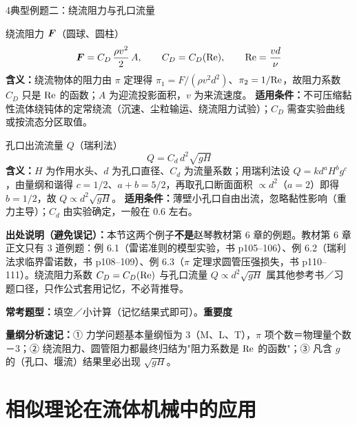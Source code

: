 \begin{kaodian}{4}{典型例题二：绕流阻力与孔口流量}
\begin{gongshi}{绕流阻力 $\bm{F}$（圆球、圆柱）}
\[ \bm{F}=C_D\,\frac{\rho v^{2}}{2}\,A,\qquad C_D=C_D(\mathrm{Re}),\qquad \mathrm{Re}=\frac{vd}{\nu} \]
\textbf{含义：}绕流物体的阻力由 $\pi$ 定理得 $\pi_1=F/(\rho v^{2}d^{2})$、$\pi_2=1/\mathrm{Re}$，故阻力系数 $C_D$ 只是 $\mathrm{Re}$ 的函数；$A$ 为迎流投影面积，$v$ 为来流速度。
\textbf{适用条件：}不可压缩黏性流体绕钝体的定常绕流（沉速、尘粒输运、绕流阻力试验）；$C_D$ 需查实验曲线或按流态分区取值。
\end{gongshi}

\begin{gongshi}{孔口出流流量 $Q$（瑞利法）}
\[ Q=C_d\,d^{2}\sqrt{gH} \]
\textbf{含义：}$H$ 为作用水头、$d$ 为孔口直径、$C_d$ 为流量系数；用瑞利法设 $Q=k d^{a}H^{b}g^{c}$，由量纲和谐得 $c=1/2$、$a+b=5/2$，再取孔口断面面积 $\propto d^{2}$（$a=2$）即得 $b=1/2$，故 $Q\propto d^{2}\sqrt{gH}$。
\textbf{适用条件：}薄壁小孔口自由出流，忽略黏性影响（重力主导）；$C_d$ 由实验确定，一般在 0.6 左右。
\end{gongshi}

\begin{tishi}
\textbf{出处说明（避免误记）：}本节这两个例子\textbf{不是}赵琴教材第 6 章的例题。教材第 6 章正文只有 3 道例题：例 6.1（雷诺准则的模型实验，书 p105--106）、例 6.2（瑞利法求临界雷诺数，书 p108--109）、例 6.3（$\pi$ 定理求圆管压强损失，书 p110--111）。绕流阻力系数 $C_D=C_D(\mathrm{Re})$ 与孔口流量 $Q\propto d^{2}\sqrt{gH}$ 属其他参考书／习题口径，只作公式套用记忆，不必背推导。
\end{tishi}

\textbf{常考题型：}填空／小计算（记忆结果式即可）。\quad\textbf{重要度 }\quad{}\quad{}
\end{kaodian}

\begin{tishi}
\textbf{量纲分析速记：}① 力学问题基本量纲恒为 3（M、L、T），$\pi$ 项个数＝物理量个数－3；② 绕流阻力、圆管阻力都最终归结为"阻力系数是 $\mathrm{Re}$ 的函数"；③ 凡含 $g$ 的（孔口、堰流）结果里必出现 $\sqrt{gH}$。
\end{tishi}

\section{相似理论在流体机械中的应用}

